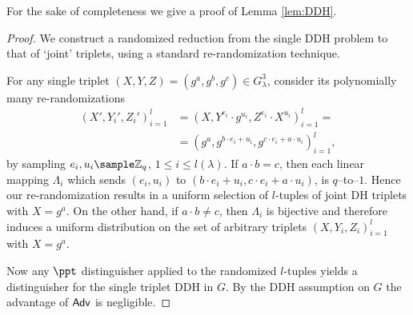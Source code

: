 For the sake of completeness we give a proof of Lemma \ref{lem:DDH}.
\begin{proof}
We construct a randomized reduction from the single DDH problem to that of `joint' triplets, using a standard re-randomization technique. 

For any single triplet $(X,Y,Z)=(g^{a}, g^b, g^c)\in G_\lambda^3$, consider its polynomially many re-randomizations
\begin{align*}
(X',Y_i',Z_i')_{i=1}^l&= \left( X, Y^{e_i}\cdot g^{u_i}, Z^{e_i}\cdot X^{u_i}\right)_{i=1}^l =
\\
&=\left( g^{a}, g^{b\cdot e_i + u_i}, g^{c\cdot e_i+ a\cdot u_i}\right)_{i=1}^l,
\end{align*}
by sampling $e_i, u_i\sample\Z_q$, $1\leq i \leq l(\lambda)$.
If $a\cdot b = c$, then each linear mapping  
$\Lambda_i$ which sends $(e_i, u_i)$ to $\left(b\cdot e_i+u_i, c\cdot e_i + a\cdot u_i\right)$, is $q$--to--$1$.
Hence our re-randomization results in a uniform selection of $l$-tuples of joint DH triplets with $X=g^a$.
On the other hand, if $a\cdot b \neq c$, then $\Lambda_i$ is bijective and therefore induces a uniform distribution on the set of arbitrary triplets $(X,Y_i,Z_i)_{i=1}^l$ with $X=g^a$.

Now any $\ppt$ distinguisher applied to the randomized $l$-tuples yields a distinguisher for the single triplet DDH in $G$.
By the DDH assumption on $G$ the advantage of $\mathsf{Adv}$ is negligible.%
\end{proof}


